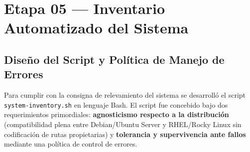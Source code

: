 \documentclass[11pt,a4paper]{article}
\begin{document}
\section{Etapa 05 — Inventario Automatizado del Sistema}

\subsection{Diseño del Script y Política de Manejo de Errores}

Para cumplir con la consigna de relevamiento del sistema se desarrolló el script \texttt{system-inventory.sh} en lenguaje Bash. El script fue concebido bajo dos requerimientos primordiales: \textbf{agnosticismo respecto a la distribución} (compatibilidad plena entre Debian/Ubuntu Server y RHEL/Rocky Linux sin codificación de rutas propietarias) y \textbf{tolerancia y supervivencia ante fallos} mediante una política de control de errores.
\end{document}
